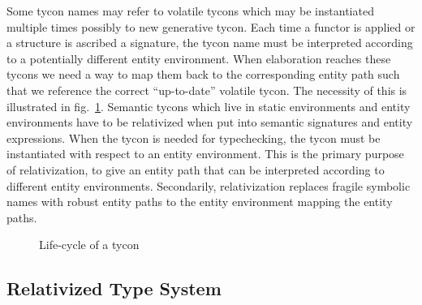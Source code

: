 Some tycon names may refer to volatile tycons which may be instantiated multiple times possibly to new generative tycon. Each time a functor is applied or a structure is ascribed a signature, the tycon name must be interpreted according to a potentially different entity environment. When elaboration reaches these tycons we need a way to map them back to the corresponding entity path such that we reference the correct ``up-to-date'' volatile tycon. The necessity of this is illustrated in fig.~\ref{fig:lifecycle}. Semantic tycons which live in static environments and entity environments have to be relativized when put into semantic signatures and entity expressions. When the tycon is needed for typechecking, the tycon must be instantiated with respect to an entity environment. This is the primary purpose of relativization, to give an entity path that can be interpreted according to different entity environments. Secondarily, relativization replaces fragile symbolic names with robust entity paths to the entity environment mapping the entity paths. 

\begin{figure}
\begin{center}
\end{center}
\caption{Life-cycle of a tycon}
\label{fig:lifecycle}
\end{figure}

\subsection{Relativized Type System}\label{sec:relativized-type-sys}

  
